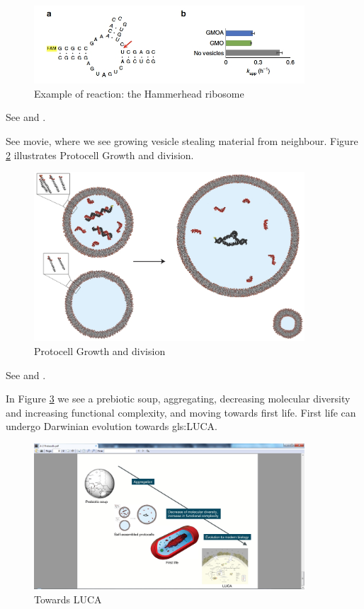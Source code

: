 \documentclass[]{article}
\begin{document}
\begin{figure}[H]
	\caption{Example of reaction: the Hammerhead ribosome}\label{fig:ProtocellsAndReactions3}
	\includegraphics[width=0.9\textwidth]{ProtocellsAndReactions3}
\end{figure}



See \cite{adamala2016programmable} and \cite{monnard2015current}.

See movie, where we see growing vesicle stealing material from neighbour. 
Figure \ref{fig:ProtocellGrowthDivision} illustrates Protocell Growth and division.  

\begin{figure}[H]
	\caption{Protocell Growth and division}\label{fig:ProtocellGrowthDivision}
	\includegraphics[width=0.9\textwidth]{ProtocellGrowthDivision}
\end{figure}

See  \cite{zhu2012photochemically} and   \cite{chen2004emergence}.

In Figure \ref{fig:TowardsLUCA} we see a prebiotic soup, aggregating, decreasing molecular diversity and increasing functional complexity, and moving towards first life. First life can undergo Darwinian evolution towards \gls{gls:LUCA}.
\begin{figure}[H]
	\caption{Towards LUCA}\label{fig:TowardsLUCA}
	\includegraphics[width=0.9\textwidth]{TowardsLUCA}
\end{figure}
\end{document}
